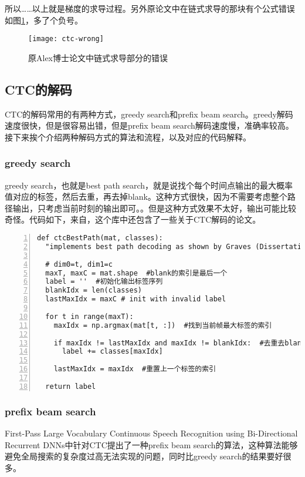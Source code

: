 {{所以……以上就是梯度的求导过程。另外原论文中在链式求导的那块有个公式错误如图\ref{fig:ctc-error}，多了个负号。
\begin{figure}[h]
  \centering
  \texttt{[image: ctc-wrong]}
  \caption{原Alex博士论文中链式求导部分的错误 \label{fig:ctc-error}}
\end{figure}

\subsection{CTC的解码}
CTC的解码常用的有两种方式，greedy search和prefix beam search。greedy解码速度很快，但是很容易出错，但是prefix beam search解码速度慢，准确率较高。接下来挨个介绍两种解码方式的算法和流程，以及对应的代码解释。
\subsubsection{greedy search}
greedy search，也就是best path search，就是说找个每个时间点输出的最大概率值对应的标签，然后去重，再去掉blank。这种方式很快，因为不需要考虑整个路径输出，只考虑当前时刻的输出即可。。但是这种方式效果不太好，输出可能比较奇怪。代码如下，来自，这个库中还包含了一些关于CTC解码的论文。
\begin{lstlisting}[language = shell, numbers=left, 
         numberstyle=\tiny,keywordstyle=\color{blue!70},
         commentstyle=\color{red!50!green!50!blue!50},frame=shadowbox,
         rulesepcolor=\color{red!20!green!20!blue!20},basicstyle=\ttfamily]
def ctcBestPath(mat, classes):
  "implements best path decoding as shown by Graves (Dissertation, p63)"

  # dim0=t, dim1=c
  maxT, maxC = mat.shape  #blank的索引是最后一个
  label = ''  #初始化输出标签序列
  blankIdx = len(classes)  
  lastMaxIdx = maxC # init with invalid label

  for t in range(maxT):
    maxIdx = np.argmax(mat[t, :])  #找到当前帧最大标签的索引

    if maxIdx != lastMaxIdx and maxIdx != blankIdx:  #去重去blank
      label += classes[maxIdx]

    lastMaxIdx = maxIdx  #重置上一个标签的索引

  return label
\end{lstlisting}

\subsubsection{prefix beam search}
First-Pass Large Vocabulary Continuous Speech Recognition using Bi-Directional Recurrent DNNs中针对CTC提出了一种prefix beam search的算法，这种算法能够避免全局搜索的复杂度过高无法实现的问题，同时比greedy search的结果要好很多。

}}

